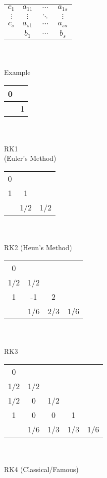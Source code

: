 \documentclass[9pt]{article}
\begin{document}
\vspace{-5pt}
\begin{minipage}{0.15\linewidth}
    \centering
    \begin{tabular}{c|ccc}
        $c_1$ & $a_{11}$ & $\cdots$ & $a_{1s}$ \\
        $\vdots$ & $\vdots$ & $\ddots$ & $\vdots$ \\
        $c_s$ & $a_{s1}$ & $\cdots$ & $a_{ss}$ \\
        \hline
            & $b_1$ & $\cdots$ & $b_s$
    \end{tabular}
    \\~\\
    {Example}
\end{minipage}
\hfill
\begin{minipage}{0.15\linewidth}
    \centering
    \begin{tabular}{c|c}
        0 &  \\
        \hline
          & 1
    \end{tabular}
    \\~\\
    {RK1 \\ (Euler's Method)}
\end{minipage}
\hfill
\begin{minipage}{0.15\linewidth}
    \centering
    \begin{tabular}{c|cc}
        0   &    &  \\
        1   & 1   &  \\
        \hline
            & 1/2 & 1/2
    \end{tabular}
    \\~\\
    {RK2 (Heun's Method)}
\end{minipage}
\hfill
\begin{minipage}{0.2\linewidth}
    \centering
    \begin{tabular}{c|ccc}
        0   &    &    &  \\
        1/2 & 1/2 &    &  \\
        1   & -1  & 2   &  \\
        \hline
            & 1/6 & 2/3 & 1/6
    \end{tabular}
    \\~\\
    {RK3}
\end{minipage}
\hfill
\begin{minipage}{0.3\linewidth}
    \centering
    \begin{tabular}{c|cccc}
        0   &    &    &    &  \\
        1/2 & 1/2 &    &    &  \\
        1/2 & 0   & 1/2 &    &  \\
        1   & 0   & 0   & 1   &  \\
        \hline
            & 1/6 & 1/3 & 1/3 & 1/6
    \end{tabular}
    \\~\\
    {RK4 (Classical/Famous)}
\end{minipage}
\end{document}
